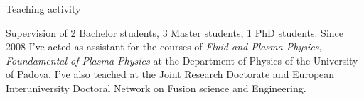 \begin{cvblock}{Teaching activity}
\end{cvblock}
Supervision of 2 Bachelor students, 3 Master students, 1 PhD
students. Since 2008 I've acted as assistant for the courses of
\emph{Fluid and Plasma Physics}, \emph{Foundamental of Plasma Physics}
at the Department of Physics of the University of Padova. I've also
teached at the Joint Research Doctorate and European Interuniversity
Doctoral Network on Fusion science and Engineering.\\
